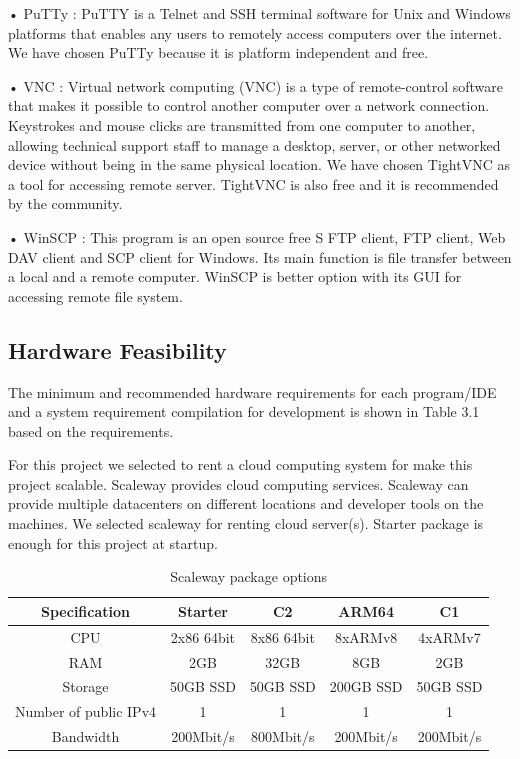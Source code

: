 • PuTTy : PuTTY is a Telnet and SSH terminal software for Unix and Windows platforms that enables any users to remotely access computers over the internet. 
\cite{PuttyTanim}
We have chosen PuTTy because it is platform independent and free.

• VNC : Virtual network computing (VNC) is a type of remote-control software that makes it possible to control another computer over a network connection. Keystrokes and mouse clicks are transmitted from one computer to another, allowing technical support staff to manage a desktop, server, or other networked device without being in the same physical location. 
\cite{VNCTanim}
We have chosen TightVNC as a tool for accessing remote server. TightVNC is also free and it is recommended by the community.

• WinSCP : This program is an open source free S FTP client, FTP client, Web DAV client and SCP client for Windows. Its main function is file transfer between a local and a remote computer.
\cite{WinSCPTanim}
 WinSCP is better option with its GUI for accessing remote file system. 

\subsection{Hardware Feasibility}
The minimum and recommended hardware requirements for each program/IDE and
a system requirement compilation for development is shown in Table 3.1 based on
the requirements.

For this project we selected to rent a cloud computing system for make this project scalable. Scaleway\cite{scaleway} provides cloud computing services. Scaleway can provide multiple datacenters on different locations and developer tools on the machines. We selected scaleway for renting cloud server(s). Starter package is enough for this project at startup.

\begin{table}[!ht]
\centering
\caption{Scaleway package options}
\label{minreq}
\begin{tabular}{|c|c|c|c|c|}
\hline
\textbf{Specification}& \textbf{Starter} & \textbf{C2}  & \textbf{ARM64} & \textbf{C1} \\ \hline
CPU                             & 2x86 64bit & 8x86 64bit  & 8xARMv8 & 4xARMv7 \\ \hline
RAM                             & 2GB & 32GB & 8GB & 2GB \\ \hline
Storage                         & 50GB SSD & 50GB SSD & 200GB SSD & 50GB SSD \\ \hline
Number of public IPv4  & 1 & 1 & 1 & 1  \\ \hline
Bandwidth                       & 200Mbit/s & 800Mbit/s & 200Mbit/s & 200Mbit/s \\ \hline
\end{tabular}
\end{table}

